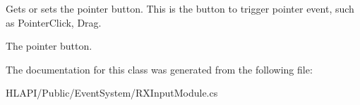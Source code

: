 Gets or sets the pointer button. This is the button to trigger pointer event, such as Pointer\+Click, Drag. 

The pointer button.

The documentation for this class was generated from the following file\+:\begin{DoxyCompactItemize}
\item 
H\+L\+A\+P\+I/\+Public/\+Event\+System/R\+X\+Input\+Module.\+cs\end{DoxyCompactItemize}
